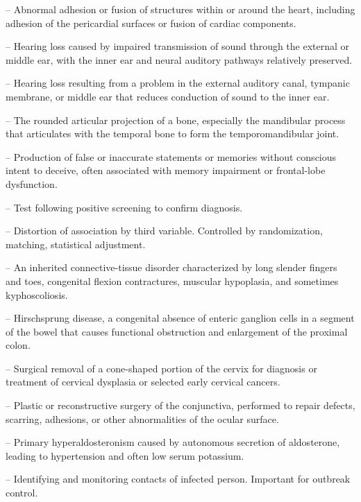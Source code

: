 -- Abnormal adhesion or fusion of structures within or around the heart, including adhesion of the pericardial surfaces or fusion of cardiac components.

-- Hearing loss caused by impaired transmission of sound through the external or middle ear, with the inner ear and neural auditory pathways relatively preserved.

-- Hearing loss resulting from a problem in the external auditory canal, tympanic membrane, or middle ear that reduces conduction of sound to the inner ear.

-- The rounded articular projection of a bone, especially the mandibular process that articulates with the temporal bone to form the temporomandibular joint.

-- Production of false or inaccurate statements or memories without conscious intent to deceive, often associated with memory impairment or frontal-lobe dysfunction.

-- Test following positive screening to confirm diagnosis.

-- Distortion of association by third variable. Controlled by randomization, matching, statistical adjustment.

-- An inherited connective-tissue disorder characterized by long slender fingers and toes, congenital flexion contractures, muscular hypoplasia, and sometimes kyphoscoliosis.

-- Hirschsprung disease, a congenital absence of enteric ganglion cells in a segment of the bowel that causes functional obstruction and enlargement of the proximal colon.

-- Surgical removal of a cone-shaped portion of the cervix for diagnosis or treatment of cervical dysplasia or selected early cervical cancers.

-- Plastic or reconstructive surgery of the conjunctiva, performed to repair defects, scarring, adhesions, or other abnormalities of the ocular surface.

-- Primary hyperaldosteronism caused by autonomous secretion of aldosterone, leading to hypertension and often low serum potassium.

-- Identifying and monitoring contacts of infected person. Important for outbreak control.

